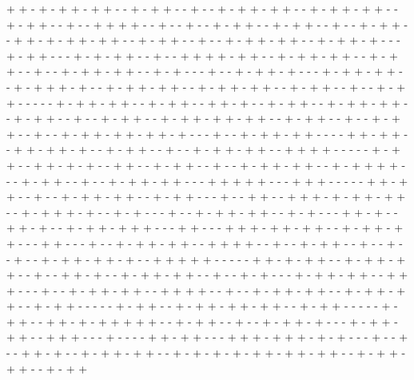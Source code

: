 + + - + - + + - + + - - + - + + - - + - - + - + + - + + - - + - + + - + + - - + - + + - - + - - + + + + - - + - - + - - + - + + - - + - + + - - + - - + - + + - - + + - + - + + - + + - - + - + + - - + - - + - + + - + + - - + - + + - + - - - + - + + - - - + - + - + + - - + - - + + + + - + + - - + - + + - + + - - + - + + - - + - - + - + + - + + - - + - + - - - + - - + - + + - + - - - + - + + - + + - - + - + + + - + - - + - + + - + + - - + - + + - + + - - + - + + - - + - - + - + + - - - - - + - + + - + + - - + - + + - - + + - + - - + - + + - - + - + + - + + - - + - + + - - + - - + - + + - - + - + + - + + - + + - - + - + + - - + - - + - + + - - + - - + - + + - + + - + + - + - - - + - - + - + + - + + - - - - + + - + + - - + + - + + - + - - + - + + - - + - - + - + + - + + - - + + + + - - - - - + - + + - - + + - + - + - - + + - - + - + + - - + - - + - + + - + + - - + - + + + + - - - + - + + - - + - - + - + + - + + - - - + + + + + - - - + + + - - - - - + + - + + - - + - - + - + + - + + - - + - + + - - - + - - + + - - + + + - + - + + - + + - - + - + + + - + - - + - + - - - + - - + - + + - + + - - + - + - - - + + - + - - + + - + - - + - + + - + + + - - - + + - - - + + + - + + - + + - - + - + + - + + - - - + + - - - + - - + - + + - + + - - + + + + - - + - - + - + + - - + - - + - - + - - + - + + - + + - + - - + + + + + - - - - - + + - + - + + - - + - + + - + + - - + - - + + - + - - + - + + - + + - - + - - + - + - - - + - + + - + + - - + + + - - - + - - + - + + - + + - - + + + + - - + - - + - + + - + + - - + - + + - + + - - + - + + - - - - - + - + + - - + - + + - + + - + + - - + - + + - - - - - + - + + - - + + - + - + + + + + - - + - + + - - + - - + - + + - + - - - + - + + - + + - - + + + - - - + - - - - + + - + + - - - + + + - + + + - + - + - - - + - - + - - + + - + - - + - + + - + + - - + - + - + - + - + + - + + - + + - - + - + + - + + - - + - + + 
